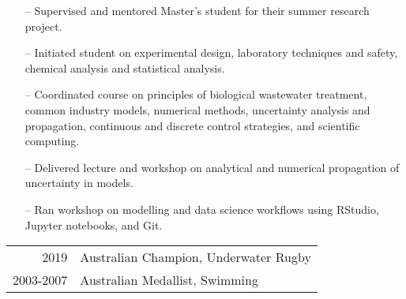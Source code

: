 \documentclass[10pt,a4paper]{altacv}
\begin{document}
\begin{itemize}
    \setlength{\itemindent}{0.3em}
    \item[--]   \small{Supervised and mentored Master's student for their summer research project.}
    \item[--]   \small{Initiated student on experimental design, laboratory techniques and safety, chemical analysis and statistical analysis.}
\end{itemize}
\divider\smallskip

\begin{itemize}
    \setlength{\itemindent}{0.3em}
    \item[--]   \small{Coordinated course on principles of biological wastewater treatment, 
    common industry models, numerical methods, 
    uncertainty analysis and propagation, 
    continuous and discrete control strategies, 
    and scientific computing.}
\end{itemize}
\divider\smallskip

\begin{itemize}
    \setlength{\itemindent}{0.3em}
    \item[--]   \small{Delivered lecture and workshop on analytical 
    and numerical propagation of uncertainty in models.}
    \item[--]   \small{Ran workshop on modelling and data science 
    workflows using RStudio, Jupyter notebooks, and Git.}
\end{itemize}




\begin{tabular}{rl}
2019 & Australian Champion, Underwater Rugby \\
2003-2007 & Australian Medallist, Swimming\\
\end{tabular}







\end{document}
